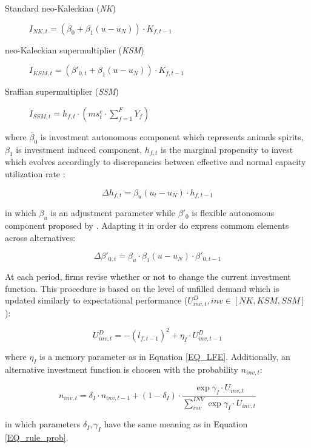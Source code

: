 \documentclass[12pt,openright,oneside,a4paper,english,sumario=tradicional]{gpsabntex}
\numberwithin{listing}{chapter}
\begin{document}
\begin{description}
\item[{Standard neo-Kaleckian  (\emph{NK})}] \(I_{NK,t} = \left(\overline{\beta}_{0} + \beta_{1}(u - u_{N})\right)\cdot K_{f,t-1}\)
\item[{neo-Kaleckian supermultiplier (\emph{KSM})}] \(I_{KSM,t} = \left(\beta'_{0,t} + \beta_{1}(u - u_{N})\right)\cdot K_{f,t-1}\)
\item[{Sraffian supermultiplier (\emph{SSM})}] \(I_{SSM,t} = h_{f,t}\cdot \left(ms^{e}_{t}\cdot \sum_{f=1}^{F}Y_{f}\right)\)
\end{description}
where \(\overline{\beta}_{0}\) is investment autonomous component which represents animals spirits, \(\beta_{1}\) is investment induced component, \(h_{f,t}\) is the marginal propensity to invest which evolves accordingly to discrepancies between effective and normal capacity utilization rate \cite{serrano_1995_Long,serrano_2017_Sraffianc}:
\begin{latex}
\begin{equation}
\Delta h_{f,t} = \beta_{u}(u_{t} - u_{N})\cdot h_{f,t-1}
\end{equation}
\end{latex}
in which \(\beta_{u}\) is an adjustment parameter while \(\beta'_{0}\) is flexible autonomous component proposed by \textcite{allain_2015_Tacklinga}.
Adapting it in order do express commom elements across alternatives:
\begin{latex}
\begin{equation}
\Delta \beta'_{0,t} = \beta_{u}\cdot\beta_{1}(u - u_{N})\cdot \beta'_{0,t-1}
\end{equation}
\end{latex}


At each period, firms revise whether or not to change the current investment function.
This procedure is based on the level of unfilled demand which is updated similarly to expectational performance (\(U^{D}_{inv,t}, inv \in [NK, KSM, SSM]\)):
\begin{latex}
\begin{equation}
U^{D}_{inv,t} = - (l_{f,t-1})^{2} + \eta_{I}\cdot U^{D}_{inv,t-1}
\end{equation}
\end{latex}
where \(\eta_{I}\) is a memory parameter as in Equation \ref{EQ_LFE}.
Additionally, an alternative investment function is choosen with the probability \(n_{inv,t}\):


\begin{latex}
\begin{equation}
\label{Ch_super_EQ_inv_prob}
n_{inv,t} = \delta_{I}\cdot n_{inv,t-1} + (1-\delta_{I})\cdot \frac{\exp{\gamma_{I}\cdot U_{inv,t}}}{\sum_{inv}^{INV}\exp{\gamma_{I}\cdot U_{inv,t}}}
\end{equation}
\end{latex}
in which parameters \(\delta_{I}, \gamma_{I}\) have the same meaning as in Equation \ref{EQ_rule_prob}.
\end{document}
